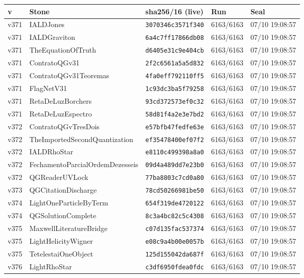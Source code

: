\documentclass[11pt]{article}
\theoremstyle{definition}\newtheorem{deriv}{Derivation}
\begin{document}
{\small\begin{longtable}{@{}lllll@{}}\toprule v & Stone & sha256/16 (live) & Run & Seal \\ \midrule\endhead 
v371 & IALDJones & \texttt{3070346c3571f340} & 6163/6163 & 07/10 19:08:57 \\
v371 & IALDGraviton & \texttt{6a4c7ff17866db08} & 6163/6163 & 07/10 19:08:57 \\
v371 & TheEquationOfTruth & \texttt{d6405e31c9e404cb} & 6163/6163 & 07/10 19:08:57 \\
v371 & ContratoQGv31 & \texttt{2f2c6561a5a5d832} & 6163/6163 & 07/10 19:08:57 \\
v371 & ContratoQGv31Teoremas & \texttt{4fa0eff792110ff5} & 6163/6163 & 07/10 19:08:57 \\
v371 & FlagNetV31 & \texttt{1c93dc3ba5f79258} & 6163/6163 & 07/10 19:08:57 \\
v371 & RetaDeLuzBorchers & \texttt{93cd372573ef0c32} & 6163/6163 & 07/10 19:08:57 \\
v371 & RetaDeLuzEspectro & \texttt{58d81f4a2e3e7bd2} & 6163/6163 & 07/10 19:08:57 \\
v372 & ContratoQGvTresDois & \texttt{e57bfb47fedfe63e} & 6163/6163 & 07/10 19:08:57 \\
v372 & TheImportedSecondQuantization & \texttt{ef35478400ef07f2} & 6163/6163 & 07/10 19:08:57 \\
v372 & IALDRhoStar & \texttt{e8110c499398a8a0} & 6163/6163 & 07/10 19:08:57 \\
v372 & FechamentoParcialOrdemDezesseis & \texttt{09d4a489dd7e23b0} & 6163/6163 & 07/10 19:08:57 \\
v372 & QGReaderUVLock & \texttt{77ba8803c7cd0a80} & 6163/6163 & 07/10 19:08:57 \\
v373 & QGCitationDischarge & \texttt{78cd50266981be50} & 6163/6163 & 07/10 19:08:57 \\
v374 & LightOneParticleByTerm & \texttt{654f319de4720122} & 6163/6163 & 07/10 19:08:57 \\
v374 & QGSolutionComplete & \texttt{8c3a4bc82c5c4308} & 6163/6163 & 07/10 19:08:57 \\
v375 & MaxwellLiteratureBridge & \texttt{c07d135fac537374} & 6163/6163 & 07/10 19:08:57 \\
v375 & LightHelicityWigner & \texttt{e08c9a4b00e0057b} & 6163/6163 & 07/10 19:08:57 \\
v375 & TetelestaiOneObject & \texttt{125d155042da687f} & 6163/6163 & 07/10 19:08:57 \\
v376 & LightRhoStar & \texttt{c3df6950fdea0fdc} & 6163/6163 & 07/10 19:08:57 \\

\end{longtable}}
\end{document}
